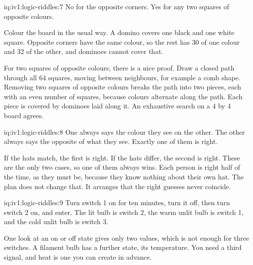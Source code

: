 \enlargethispage{-3\baselineskip}%
\begin{solution}{iq:iv1:logic-riddles:7}
No for the opposite corners. Yes for any two squares of opposite colours.

Colour the board in the usual way. A domino covers one black and one white square. Opposite corners have the same colour, so the rest has 30 of one colour and 32 of the other, and dominoes cannot cover that.

For two squares of opposite colours, there is a nice proof. Draw a closed path through all 64 squares, moving between neighbours, for example a comb shape. Removing two squares of opposite colours breaks the path into two pieces, each with an even number of squares, because colours alternate along the path. Each piece is covered by dominoes laid along it. An exhaustive search on a 4 by 4 board agrees.

\end{solution}

\begin{solution}{iq:iv1:logic-riddles:8}
One always says the colour they see on the other. The other always says the opposite of what they see. Exactly one of them is right.

If the hats match, the first is right. If the hats differ, the second is right. These are the only two cases, so one of them always wins. Each person is right half of the time, as they must be, because they know nothing about their own hat. The plan does not change that. It arranges that the right guesses never coincide.

\end{solution}

\begin{solution}{iq:iv1:logic-riddles:9}
Turn switch 1 on for ten minutes, turn it off, then turn switch 2 on, and enter. The lit bulb is switch 2, the warm unlit bulb is switch 1, and the cold unlit bulb is switch 3.

One look at an on or off state gives only two values, which is not enough for three switches. A filament bulb has a further state, its temperature. You need a third signal, and heat is one you can create in advance.

\end{solution}

